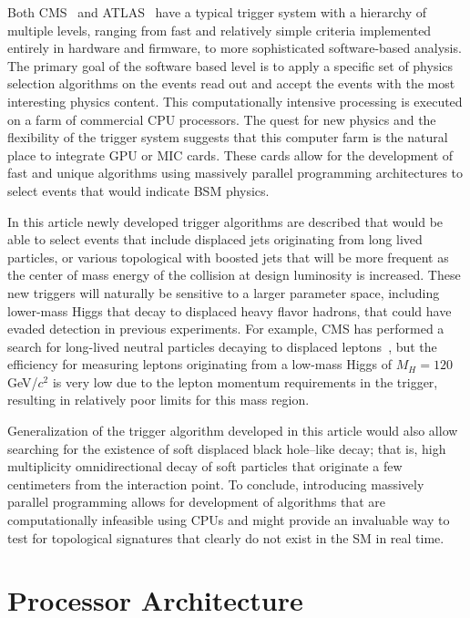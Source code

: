 \documentclass[preprint,sort&compress]{elsarticle}
\begin{document}
Both CMS~\cite{Chatrchyan:2008aa} and ATLAS~\cite{Aad:2008zzm} have a typical trigger system with a hierarchy of multiple levels, 
ranging from fast and relatively simple criteria implemented entirely in hardware and firmware, to more sophisticated software-based analysis. 
The primary goal of the software based level is to apply a specific set of 
physics selection algorithms on the events read out and accept the events with the most interesting physics 
content. This computationally intensive processing is executed on a farm of commercial CPU processors.
The quest for new physics and the flexibility of the trigger system suggests that this computer farm is the natural
place to integrate GPU or MIC cards. These cards allow for the development of fast and unique algorithms using massively
 parallel programming architectures to select events that would indicate BSM physics. 

In this article newly developed trigger algorithms are described that would be able to select events
that include displaced jets originating from long lived particles, or various topological with boosted jets that will
be more frequent as the center of mass energy of the collision at design luminosity is increased. These new
triggers will naturally be sensitive to a larger parameter space, including lower-mass Higgs that decay to
displaced heavy flavor hadrons, that could have evaded detection in previous experiments. For example, CMS has 
performed a search for long-lived neutral particles decaying to displaced leptons~\cite{Chatrchyan:2012jna}, 
but the efficiency for measuring leptons originating from a low-mass Higgs of $M_H = 120$ GeV/$c^2$ is very low 
due to the lepton momentum requirements in the trigger, resulting in relatively poor limits for this mass region.

Generalization of the trigger algorithm developed in this article would also allow searching for 
the existence of soft displaced black hole--like decay; that is, high multiplicity omnidirectional decay of soft particles  
that originate a few centimeters from the interaction point. To conclude, introducing massively parallel programming
allows for development of algorithms that are computationally infeasible using CPUs and
might provide an invaluable way to test for topological signatures that clearly do not exist in the SM in real time.



\section{Processor Architecture}
\end{document}

